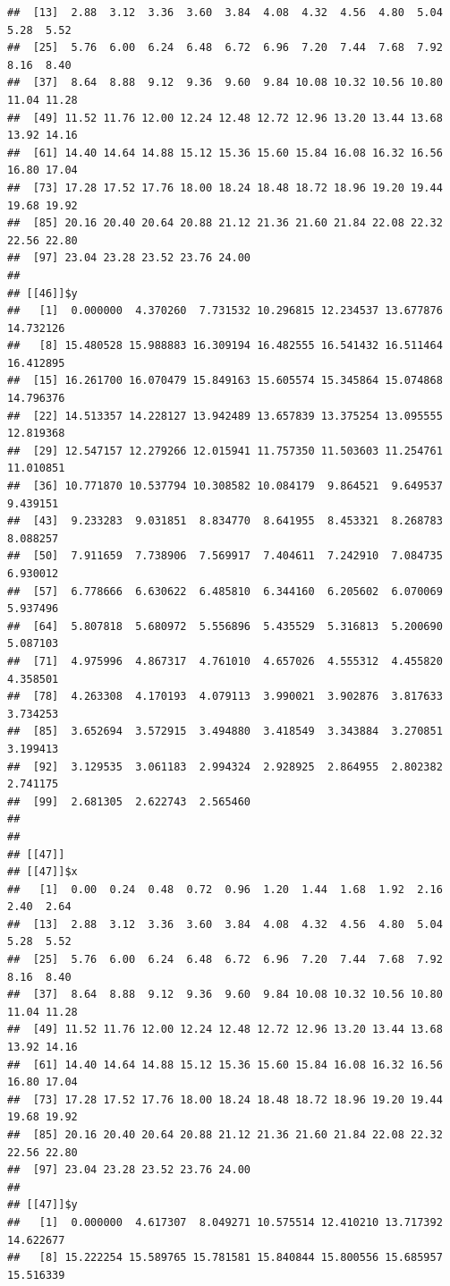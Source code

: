 \documentclass[
  ignorenonframetext,
]{beamer}
\begin{document}
\begin{frame}[fragile]{}
\begin{verbatim}
##  [13]  2.88  3.12  3.36  3.60  3.84  4.08  4.32  4.56  4.80  5.04  5.28  5.52
##  [25]  5.76  6.00  6.24  6.48  6.72  6.96  7.20  7.44  7.68  7.92  8.16  8.40
##  [37]  8.64  8.88  9.12  9.36  9.60  9.84 10.08 10.32 10.56 10.80 11.04 11.28
##  [49] 11.52 11.76 12.00 12.24 12.48 12.72 12.96 13.20 13.44 13.68 13.92 14.16
##  [61] 14.40 14.64 14.88 15.12 15.36 15.60 15.84 16.08 16.32 16.56 16.80 17.04
##  [73] 17.28 17.52 17.76 18.00 18.24 18.48 18.72 18.96 19.20 19.44 19.68 19.92
##  [85] 20.16 20.40 20.64 20.88 21.12 21.36 21.60 21.84 22.08 22.32 22.56 22.80
##  [97] 23.04 23.28 23.52 23.76 24.00
## 
## [[46]]$y
##   [1]  0.000000  4.370260  7.731532 10.296815 12.234537 13.677876 14.732126
##   [8] 15.480528 15.988883 16.309194 16.482555 16.541432 16.511464 16.412895
##  [15] 16.261700 16.070479 15.849163 15.605574 15.345864 15.074868 14.796376
##  [22] 14.513357 14.228127 13.942489 13.657839 13.375254 13.095555 12.819368
##  [29] 12.547157 12.279266 12.015941 11.757350 11.503603 11.254761 11.010851
##  [36] 10.771870 10.537794 10.308582 10.084179  9.864521  9.649537  9.439151
##  [43]  9.233283  9.031851  8.834770  8.641955  8.453321  8.268783  8.088257
##  [50]  7.911659  7.738906  7.569917  7.404611  7.242910  7.084735  6.930012
##  [57]  6.778666  6.630622  6.485810  6.344160  6.205602  6.070069  5.937496
##  [64]  5.807818  5.680972  5.556896  5.435529  5.316813  5.200690  5.087103
##  [71]  4.975996  4.867317  4.761010  4.657026  4.555312  4.455820  4.358501
##  [78]  4.263308  4.170193  4.079113  3.990021  3.902876  3.817633  3.734253
##  [85]  3.652694  3.572915  3.494880  3.418549  3.343884  3.270851  3.199413
##  [92]  3.129535  3.061183  2.994324  2.928925  2.864955  2.802382  2.741175
##  [99]  2.681305  2.622743  2.565460
## 
## 
## [[47]]
## [[47]]$x
##   [1]  0.00  0.24  0.48  0.72  0.96  1.20  1.44  1.68  1.92  2.16  2.40  2.64
##  [13]  2.88  3.12  3.36  3.60  3.84  4.08  4.32  4.56  4.80  5.04  5.28  5.52
##  [25]  5.76  6.00  6.24  6.48  6.72  6.96  7.20  7.44  7.68  7.92  8.16  8.40
##  [37]  8.64  8.88  9.12  9.36  9.60  9.84 10.08 10.32 10.56 10.80 11.04 11.28
##  [49] 11.52 11.76 12.00 12.24 12.48 12.72 12.96 13.20 13.44 13.68 13.92 14.16
##  [61] 14.40 14.64 14.88 15.12 15.36 15.60 15.84 16.08 16.32 16.56 16.80 17.04
##  [73] 17.28 17.52 17.76 18.00 18.24 18.48 18.72 18.96 19.20 19.44 19.68 19.92
##  [85] 20.16 20.40 20.64 20.88 21.12 21.36 21.60 21.84 22.08 22.32 22.56 22.80
##  [97] 23.04 23.28 23.52 23.76 24.00
## 
## [[47]]$y
##   [1]  0.000000  4.617307  8.049271 10.575514 12.410210 13.717392 14.622677
##   [8] 15.222254 15.589765 15.781581 15.840844 15.800556 15.685957 15.516339

\end{verbatim}
\end{frame}
\end{document}
